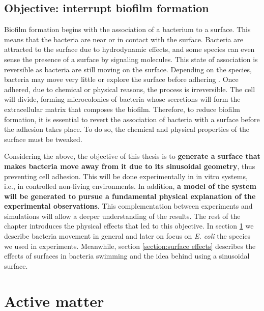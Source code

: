 \subsection{Objective: interrupt biofilm formation}

Biofilm formation begins with the association of a bacterium to a surface. This means that the bacteria are near or in contact with the surface. Bacteria are attracted to the surface due to hydrodynamic effects, and some species can even sense the presence of a surface by signaling molecules. This state of association is reversible as bacteria are still moving on the surface. Depending on the species, bacteria may move very little or explore the surface before adhering \cite{Costerton1999IntroductionBiofilm}. Once adhered, due to chemical or physical reasons, the process is irreversible. The cell will divide, forming microcolonies of bacteria whose secretions will form the extracellular matrix that composes the biofilm. Therefore, to reduce biofilm formation, it is essential to revert the association of bacteria with a surface before the adhesion takes place. To do so, the chemical and physical properties of the surface must be tweaked.

Considering the above, the objective of this thesis is to \textbf{generate a surface that makes bacteria move away from it due to its sinusoidal geometry}, thus preventing cell adhesion. This will be done experimentally in in vitro systems, i.e., in controlled non-living environments. In addition, \textbf{a model of the system will be generated to pursue a fundamental physical explanation of the experimental observations}. This complementation between experiments and simulations will allow a deeper understanding of the results. The rest of the chapter introduces the physical effects that led to this objective. In section \ref{section:active matter} we describe bacteria movement in general and later on focus on \textit{E. coli} the species we used in experiments. Meanwhile, section \ref{section:surface effects} describes the effects of surfaces in bacteria swimming and the idea behind using a sinusoidal surface.

\section{Active matter}
\label{section:active matter}

